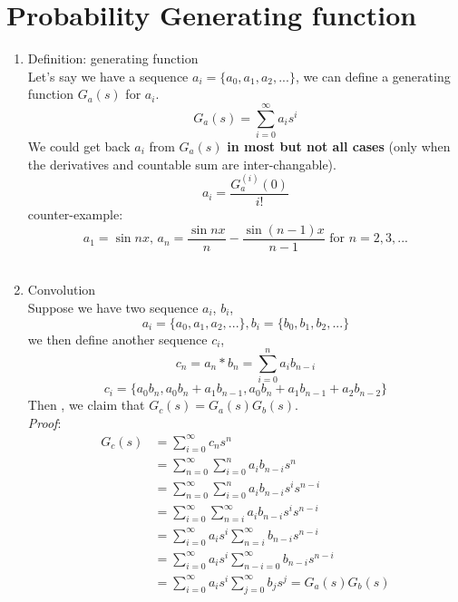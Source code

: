 \documentclass[11pt]{article}
\begin{document}
\section{Probability Generating function}
\begin{enumerate}
\item Definition: generating function\\
Let's say we have a sequence $a_i = \{a_0, a_1,a_2, ...\}$, we can define a generating function $G_a(s)$ for $a_i$.\\
$$G_a(s)=\sum_{i=0}^{\infty}a_{i} s^{i}$$
We could get back $a_{i}$ from $G_{a}(s)$ \textbf{in most but not all cases} (only when the derivatives and countable sum are inter-changable).
$$a_{i} = \dfrac{G_{a}^{(i)}(0)}{i!} $$
counter-example: \\
$$a_1 = \sin{nx} \text{, } a_n = \dfrac{\sin{nx}}{n} - \dfrac{\sin{(n-1)x}}{n-1} \text{ for $n = 2,3,...$}$$ \\

\item Convolution \\
Suppose we have two sequence $a_i$, $b_i$,
$$a_i = \{a_0, a_1, a_2, ... \}, b_i = \{b_0, b_1, b_2, ... \}$$
we then define another sequence $c_i$,
$$c_n = a_{n} * b_{n} = \sum_{i=0}^{n} a_i b_{n-i}$$
$$c_i=\{a_{0}b_{n}, a_{0}b_{n}+a_{1}b_{n-1}, a_{0}b_{n}+a_{1}b_{n-1}+a_{2}b_{n-2}\}$$
Then , we claim that $G_{c}(s) = G_{a}(s)G_{b}(s)$.\\
\textit{Proof}:
\begin{align*}
G_{c}(s) &= \sum_{i=0}^{\infty} c_{n} s^{n}\\
&= \sum_{n=0}^{\infty} \sum_{i=0}^{n} a_i b_{n-i} s^{n}\\
&= \sum_{n=0}^{\infty} \sum_{i=0}^{n} a_i b_{n-i} s^{i} s^{n-i} \\
&= \sum_{i=0}^{\infty} \sum_{n=i}^{\infty} a_i b_{n-i} s^{i} s^{n-i} \\
&= \sum_{i=0}^{\infty} a_{i} s^{i} \sum_{n=i}^{\infty} b_{n-i} s^{n-i} \\
&= \sum_{i=0}^{\infty} a_{i} s^{i} \sum_{n-i=0}^{\infty} b_{n-i} s^{n-i} \\
&= \sum_{i=0}^{\infty} a_{i} s^{i} \sum_{j=0}^{\infty} b_{j} s^{j}  = G_{a}(s) G_{b}(s)\\
\end{align*}


\end{enumerate}
\end{document}
